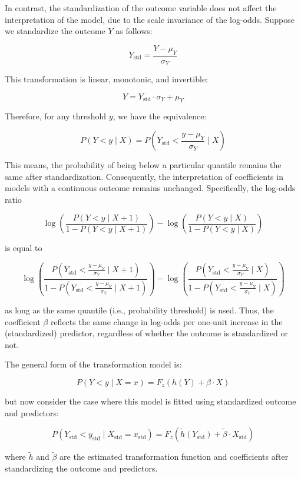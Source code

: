 In contrast, the standardization of the outcome variable does not affect the interpretation of the model, due to the scale invariance of the log-odds. Suppose we standardize the outcome $Y$ as follows:

\[
Y_{\text{std}} = \frac{Y - \mu_Y}{\sigma_Y}
\]

This transformation is linear, monotonic, and invertible:

\[
Y = Y_{\text{std}} \cdot \sigma_Y + \mu_Y
\]

Therefore, for any threshold $y$, we have the equivalence:

\[
P(Y < y \mid X) = P\left(Y_{\text{std}} < \frac{y - \mu_Y}{\sigma_Y} \mid X\right)
\]


This means, the probability of being below a particular quantile remains the same after standardization. Consequently, the interpretation of coefficients in models with a continuous outcome remains unchanged. Specifically, the log-odds ratio


\[
\log \left( \frac{P(Y < y \mid X + 1)}{1 - P(Y < y \mid X + 1)} \right) -
\log \left( \frac{P(Y < y \mid X)}{1 - P(Y < y \mid X)} \right)
\]

is equal to

\[
\log \left( \frac{P\left(Y_{\text{std}} < \frac{y - \mu_Y}{\sigma_Y} \mid X + 1\right)}{1 - P\left(Y_{\text{std}} < \frac{y - \mu_Y}{\sigma_Y} \mid X + 1\right)} \right) -
\log \left( \frac{P\left(Y_{\text{std}} < \frac{y - \mu_Y}{\sigma_Y} \mid X\right)}{1 - P\left(Y_{\text{std}} < \frac{y - \mu_Y}{\sigma_Y} \mid X\right)} \right)
\]

as long as the same quantile (i.e., probability threshold) is used. Thus, the coefficient $\beta$ reflects the same change in log-odds per one-unit increase in the (standardized) predictor, regardless of whether the outcome is standardized or not.


The general form of the transformation model is:


\[
P(Y < y \mid X = x) = F_z\left(h(Y) + \beta \cdot X\right)
\]

but now consider the case where this model is fitted using standardized outcome and predictors:

\[
P(Y_{\text{std}} < y_{\text{std}} \mid X_{\text{std}} = x_{\text{std}}) = F_z\left(\tilde{h}(Y_{\text{std}}) + \tilde{\beta} \cdot X_{\text{std}}\right)
\]


where $\tilde{h}$ and $\tilde{\beta}$ are the estimated transformation function and coefficients after standardizing the outcome and predictors.




